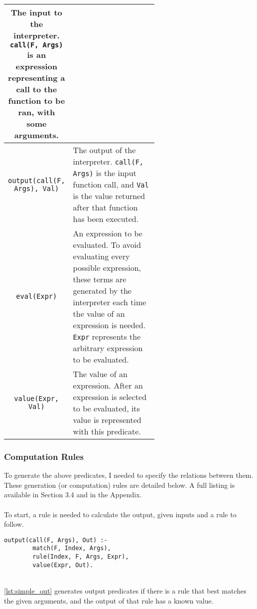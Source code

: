 \begin{center}
\begin{tabular}{| c | m{0.6\linewidth} |}
The input to the interpreter. \lstinline!call(F, Args)! is an expression representing a call to the function to be ran, with some arguments. \newline
\\
\hline
\lstinline!output(call(F, Args), Val)! 
& 
\mbox{}\newline
The output of the interpreter. \lstinline!call(F, Args)! is the input function call, and \lstinline!Val! is the value returned after that function has been executed. \newline
\\
\hline
\lstinline!eval(Expr)! 
& 
\mbox{}\newline
An expression to be evaluated. To avoid evaluating every possible expression, these terms are generated by the interpreter each time the value of an expression is needed. \newline
\lstinline!Expr! represents the arbitrary expression to be evaluated. \newline 
\\
\hline
\lstinline!value(Expr, Val)! 
& 
\mbox{}\newline
The value of an expression. After an expression is selected to be evaluated, its value is represented with this predicate.\newline 
\\
\hline
\end{tabular}
\end{center}
 
\subsubsection{Computation Rules}
To generate the above predicates, I needed to specify the relations between them. These generation (or computation) rules are detailed below. A full listing is available in Section 3.4 and in the Appendix.\\ \\
To start, a rule is needed to calculate the output, given inputs and a rule to follow. \\

\begin{lstlisting}[caption={Output generation}, label={lst:simple_out}, firstnumber=55]
output(call(F, Args), Out) :- 
		match(F, Index, Args), 
		rule(Index, F, Args, Expr), 
		value(Expr, Out).	
\end{lstlisting}
\mbox{} \\
\ref{lst:simple_out} generates output predicates if there is a rule that best matches the given arguments, and the output of that rule has a known value. \\

